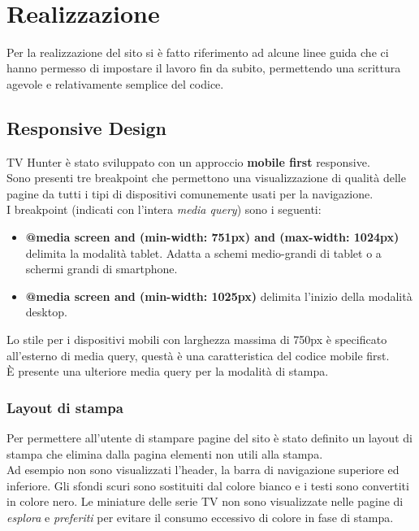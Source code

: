 ~\\

\section{Realizzazione}
Per la realizzazione del sito si è fatto riferimento ad alcune linee guida che ci hanno permesso di impostare il lavoro fin da subito, permettendo una scrittura agevole e relativamente semplice del codice.

\subsection{Responsive Design}
TV Hunter è stato sviluppato con un approccio \textbf{mobile first} responsive.\\
Sono presenti tre breakpoint che permettono una visualizzazione di qualità delle pagine da tutti i tipi di dispositivi comunemente usati per la navigazione.\\
I breakpoint (indicati con l'intera \textit{media query}) sono i seguenti:
\begin{itemize}
	\item \textbf{@media screen and (min-width: 751px) and (max-width: 1024px)} delimita la modalità tablet. Adatta a schemi medio-grandi di tablet o a schermi grandi di smartphone.
	\item \textbf{@media screen and (min-width: 1025px)} delimita l'inizio della modalità desktop. 
\end{itemize}
Lo stile per i dispositivi mobili con larghezza massima di 750px è specificato all'esterno di media query, questà è una caratteristica del codice mobile first.\\
È presente una ulteriore media query per la modalità di stampa.
\subsubsection{Layout di stampa}
Per permettere all'utente di stampare pagine del sito è stato definito un layout di stampa che elimina dalla pagina elementi non utili alla stampa.\\
Ad esempio non sono visualizzati l'header, la barra di navigazione superiore ed inferiore. Gli sfondi scuri sono sostituiti dal colore bianco e i testi sono convertiti in colore nero. Le miniature delle serie TV non sono visualizzate nelle pagine di \textit{esplora} e \textit{preferiti} per evitare il consumo eccessivo di colore in fase di stampa.

